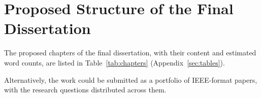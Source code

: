 \section{Proposed Structure of the Final Dissertation}
\label{sec:structure}

The proposed chapters of the final dissertation, with their content and estimated word counts, are listed in Table~\ref{tab:chapters} (Appendix~\ref{sec:tables}).

Alternatively, the work could be submitted as a portfolio of IEEE-format papers, with the research questions distributed across them.
